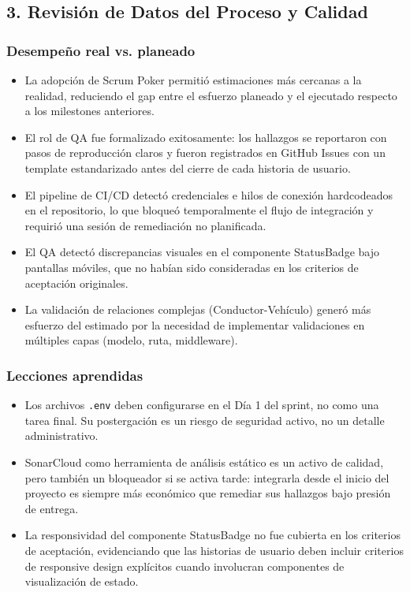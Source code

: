 \documentclass[11pt,a4paper]{article}
\begin{document}
\subsection{3. Revisión de Datos del Proceso y Calidad}

\subsubsection{Desempeño real vs. planeado}

\begin{itemize}[leftmargin=1.2em]
\item La adopción de Scrum Poker permitió estimaciones más cercanas a la realidad, reduciendo el gap entre el esfuerzo planeado y el ejecutado respecto a los milestones anteriores.
\item El rol de QA fue formalizado exitosamente: los hallazgos se reportaron con pasos de reproducción claros y fueron registrados en GitHub Issues con un template estandarizado antes del cierre de cada historia de usuario.
\item El pipeline de CI/CD detectó credenciales e hilos de conexión hardcodeados en el repositorio, lo que bloqueó temporalmente el flujo de integración y requirió una sesión de remediación no planificada.
\item El QA detectó discrepancias visuales en el componente StatusBadge bajo pantallas móviles, que no habían sido consideradas en los criterios de aceptación originales.
\item La validación de relaciones complejas (Conductor-Vehículo) generó más esfuerzo del estimado por la necesidad de implementar validaciones en múltiples capas (modelo, ruta, middleware).
\end{itemize}

\subsubsection{Lecciones aprendidas}

\begin{itemize}[leftmargin=1.2em]
\item Los archivos \texttt{.env} deben configurarse en el Día 1 del sprint, no como una tarea final. Su postergación es un riesgo de seguridad activo, no un detalle administrativo.
\item SonarCloud como herramienta de análisis estático es un activo de calidad, pero también un bloqueador si se activa tarde: integrarla desde el inicio del proyecto es siempre más económico que remediar sus hallazgos bajo presión de entrega.
\item La responsividad del componente StatusBadge no fue cubierta en los criterios de aceptación, evidenciando que las historias de usuario deben incluir criterios de responsive design explícitos cuando involucran componentes de visualización de estado.
\end{itemize}
\end{document}
